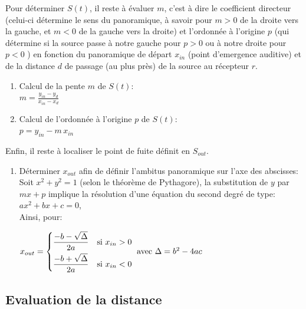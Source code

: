  \bigskip
 
 Pour d\'eterminer $S(t)$, il reste \`a \'evaluer $m$, c'est \`a dire le coefficient directeur (celui-ci d\'etermine le sens du panoramique, \`a savoir pour $m>0$ de la droite vers la gauche, et $m<0$ de la gauche vers la droite) et l'ordonn\'ee \`a l'origine $p$ (qui d\'etermine si la source passe \`a notre gauche pour $p>0$ ou \`a notre droite pour $p<0$ ) en fonction du panoramique de d\'epart $x_{in}$ (point d'emergence auditive) et de la distance $d$ de passage (au plus pr\`es) de la source au r\'ecepteur $r$.
 
 \begin{enumerate}[resume]
\item Calcul de la pente $m$ de $S(t)$:\\ 
$m=\displaystyle \frac{y_{in} - y_d}{x_{in} - x_d}$
\item Calcul de l'ordonn\'ee \`a l'origine $p$ de $S(t)$:\\ 
$p=y_{in} - m \, x_{in}$
 \end{enumerate}
 
 \bigskip
 
\noindent Enfin, il reste \`a localiser le point de fuite d\'efinit en $S_{out}$. 

 \begin{enumerate}[resume]
\item D\'eterminer $x_{out}$ afin de d\'efinir l'ambitus panoramique sur l'axe des abscisses:\\ 
Soit $x^2+y^2=1$ (selon le th\'eor\`eme de Pythagore),
la substitution de $y$ par $mx+p$ implique la r\'esolution d'une \'equation du second degr\'e de type: $ax^2+bx+c=0$,\\
Ainsi, pour:\\
$
   x_{out}=
\begin{dcases}
    \frac{-b-\sqrt{\Delta}}{2a}& \text{si } x_{in}>0\\
    \frac{-b+\sqrt{\Delta}}{2a}& \text{si } x_{in}<0
\end{dcases}
\text{ avec } \Delta=b^2-4ac
$
\end{enumerate}

\subsection*{Evaluation de la distance}

